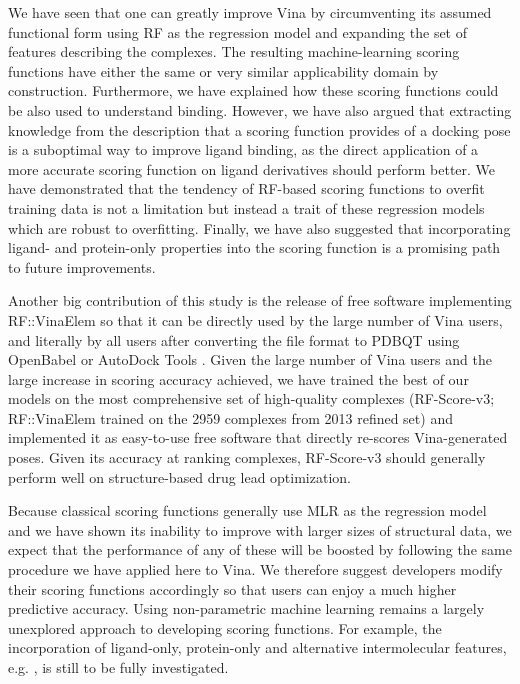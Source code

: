 We have seen that one can greatly improve Vina by circumventing its assumed functional form using RF as the regression model and expanding the set of features describing the complexes. The resulting machine-learning scoring functions have either the same or very similar applicability domain by construction. Furthermore, we have explained how these scoring functions could be also used to understand binding. However, we have also argued that extracting knowledge from the description that a scoring function provides of a docking pose is a suboptimal way to improve ligand binding, as the direct application of a more accurate scoring function on ligand derivatives should perform better. We have demonstrated that the tendency of RF-based scoring functions to overfit training data is not a limitation but instead a trait of these regression models which are robust to overfitting. Finally, we have also suggested that incorporating ligand- and protein-only properties into the scoring function is a promising path to future improvements.

Another big contribution of this study is the release of free software implementing RF::VinaElem so that it can be directly used by the large number of Vina users, and literally by all users after converting the file format to PDBQT using OpenBabel \citep{968} or AutoDock Tools \citep{596}. Given the large number of Vina users and the large increase in scoring accuracy achieved, we have trained the best of our models on the most comprehensive set of high-quality complexes (RF-Score-v3; RF::VinaElem trained on the 2959 complexes from 2013 refined set) and implemented it as easy-to-use free software that directly re-scores Vina-generated poses. Given its accuracy at ranking complexes, RF-Score-v3 should generally perform well on structure-based drug lead optimization.

Because classical scoring functions generally use MLR as the regression model and we have shown its inability to improve with larger sizes of structural data, we expect that the performance of any of these will be boosted by following the same procedure we have applied here to Vina. We therefore suggest developers modify their scoring functions accordingly so that users can enjoy a much higher predictive accuracy. Using non-parametric machine learning remains a largely unexplored approach to developing scoring functions. For example, the incorporation of ligand-only, protein-only and alternative intermolecular features, e.g. \citep{1303}, is still to be fully investigated.

